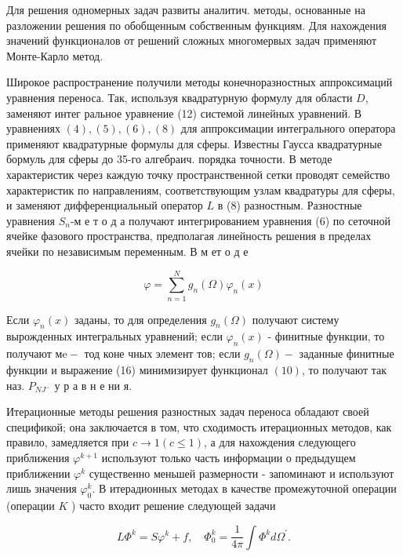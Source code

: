 \documentclass[10pt]{article}
\begin{document}
Для решения одномерных задач развиты аналитич. методы, основанные на разложении решения по обобщенным собственным функциям. Для нахождения значений функционалов от решений сложных многомервых задач применяют Монте-Карло метод.



Широкое распространение получили методы конечноразностных аппроксимаций уравнения переноса. Так, используя квадратурную формулу для области $D$, заменяют интег ральное уравнение (12) системой линейных уравнений. В уравнениях $(4),(5),(6),(8)$ для аппроксимации интегрального оператора применяют квадратурные формулы для сферы. Известны Гаусса квадратурные бормуль для сферы до 35-го алгебраич. порядка точности. В методе характеристик через каждую точку пространственной сетки проводят семейство характеристик по направлениям, соответствующим узлам квадратуры для сферы, и заменяют дифференциальный оператор $L$ в (8) разностным. Разностные уравнения $S_{n}$-м е т о д а получают интегрированием уравнения (6) по сеточной ячейке фазового пространства, предполагая линейность решения в пределах ячейки по независимым переменным. В м ет о д е



\[

\varphi=\sum_{n=1}^{N} g_{n}(\Omega) \varphi_{n}(x)

\]



Если $\varphi_{n}(x)$ заданы, то для определения $g_{n}(\Omega)$ получают систему вырожденных интегральных уравнений; если $\varphi_{n}(x)$ - финитные функции, то получают $м \mathrm{e}-$ тод коне чных элемент тов; если $g_{n}(\Omega)-$ заданные финитные функции и выражение (16) минимизирует функционал $(10)$, то получают так наз. $P_{N J^{-}}$ у р а в н е ни я.



Итерационные методы решения разностных задач переноса обладают своей спецификой; она заключается в том, что сходимость итерационных методов, как правило, замедляется при $c \rightarrow 1(c \leqslant 1)$, а для нахождения следующего приближения $\varphi^{k+1}$ используют только часть информации $о$ предыдущем приближении $\varphi^{k}$ существенно меньшей размерности - запоминают и используют лишь значения $\varphi_{0}^{k}$. В итерадионных методах в качестве промежуточной операции (операции $K$ ) часто входит решение следующей задачи



\[

L \Phi^{k}=S \varphi^{k}+f, \quad \Phi_{0}^{k}=\frac{1}{4 \pi} \int \Phi^{k} d \Omega^{\prime} .

\]
\end{document}
